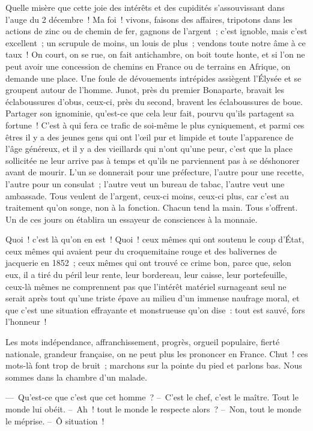 \documentclass[french,twoside]{book} %
\begin{document}
Quelle misère que cette joie des intérêts et des cupidités s’assouvissant dans l’auge du 2 décembre ! Ma foi ! vivons, faisons des affaires, tripotons dans les actions de zinc ou de chemin de fer, gagnons de l’argent ; c’est ignoble, mais c’est excellent ; un scrupule de moins, un louis de plus ; vendons toute notre âme à ce taux ! On court, on se rue, on fait antichambre, on boit toute honte, et si l’on ne peut avoir une concession de chemins en France ou de terrains en Afrique, on demande une place. Une foule de dévouements intrépides assiègent l’Élysée et se groupent autour de l’homme. Junot, près du premier Bonaparte, bravait les éclaboussures d’obus, ceux-ci, près du second, bravent les éclaboussures de boue. Partager son ignominie, qu’est-ce que cela leur fait, pourvu qu’ils partagent sa fortune ! C’est à qui fera ce trafic de soi-même le plus cyniquement, et parmi ces êtres il y a des jeunes gens qui ont l’œil pur et limpide et toute l’apparence de l’âge généreux, et il y a des vieillards qui n’ont qu’une peur, c’est que la place sollicitée ne leur arrive pas à temps et qu’ils ne parviennent pas à se déshonorer avant de mourir. L’un se donnerait pour une préfecture, l’autre pour une recette, l’autre pour un consulat ; l’autre veut un bureau de tabac, l’autre veut une ambassade. Tous veulent de l’argent, ceux-ci moins, ceux-ci plus, car c’est au traitement qu’on songe, non à la fonction. Chacun tend la main. Tous s’offrent. Un de ces jours on établira un essayeur de consciences à la monnaie.\par
Quoi ! c’est là qu’on en est ! Quoi ! ceux mêmes qui ont soutenu le coup d’État, ceux mêmes qui avaient peur du croquemitaine rouge et des balivernes de jacquerie en 1852 ; ceux mêmes qui ont trouvé ce crime bon, parce que, selon eux, il a tiré du péril leur rente, leur bordereau, leur caisse, leur portefeuille, ceux-là mêmes ne comprennent pas que l’intérêt matériel surnageant seul ne serait après tout qu’une triste épave au milieu d’un immense naufrage moral, et que c’est une situation effrayante et monstrueuse qu’on dise : tout est sauvé, fors l’honneur !\par
Les mots indépendance, affranchissement, progrès, orgueil populaire, fierté nationale, grandeur française, on ne peut plus les prononcer en France. Chut ! ces mots-là font trop de bruit ; marchons sur la pointe du pied et parlons bas. Nous sommes dans la chambre d’un malade.\par
— Qu’est-ce que c’est que cet homme ? – C’est le chef, c’est le maître. Tout le monde lui obéit. – Ah ! tout le monde le respecte alors ? – Non, tout le monde le méprise. – Ô situation !\par
\end{document}

